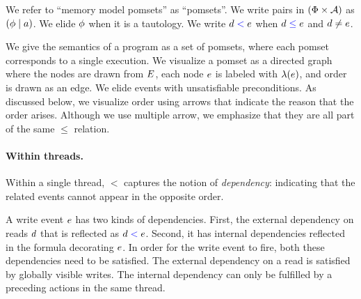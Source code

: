 We refer to ``memory model pomsets'' as ``{pomsets}''.
We write pairs in $(\Phi\times\mathcal{A})$ as $(\phi \mid a)$.  We elide
$\phi$ when it is a tautology.
We write $d\mathrel{{\color{blue}<}}e$ when $d\mathrel{{\color{blue}\leq}}e$ and $d\neq e$.

We give the semantics of a program as a set of pomsets, where each pomset
corresponds to a single execution.  We visualize a pomset as a directed graph where
the nodes are drawn from $E$, each node $e$ is labeled with
$\lambda(e)$, and order is drawn as an edge.
We elide events with unsatisfiable preconditions.
As discussed below, we visualize order using 
arrows that indicate the reason that the order arises.  Although we use
multiple arrow, we emphasize that they are all part of the same $\le$ relation.

\paragraph{Within threads.}
Within a single thread, $\lt$ captures the notion of \emph{dependency}:
indicating that the related events cannot appear in the opposite order. 
 
A write event $e$ has two kinds of dependencies.  First, the external dependency on reads $d$ that is reflected as $d  \mathrel{{\color{blue}<}} e$.  Second, it has internal dependencies reflected in the formula decorating $e$.  In order for the write event to fire, both these dependencies need to be satisfied.  The external dependency on a read is satisfied by globally visible writes.   The internal dependency can only be fulfilled by a preceding actions in the same thread.  


